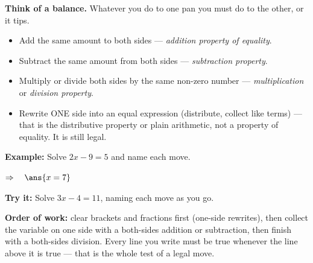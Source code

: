 \documentclass[12pt]{article}
\begin{document}


\begin{formulabox}
\textbf{Think of a balance.} Whatever you do to one pan you must do to the other, or it tips.
\begin{itemize}[leftmargin=0.75cm, itemsep=1pt, topsep=2pt]
  \item Add the same amount to both sides --- \emph{addition property of equality}.
  \item Subtract the same amount from both sides --- \emph{subtraction property}.
  \item Multiply or divide both sides by the same non-zero number --- \emph{multiplication} or
        \emph{division property}.
  \item Rewrite ONE side into an equal expression (distribute, collect like terms) --- that is the
        distributive property or plain arithmetic, not a property of equality. It is still legal.
\end{itemize}
\end{formulabox}

\begin{examplebox}
\textbf{Example:} \quad Solve $2x - 9 = 5$ and name each move.

$\Rightarrow\quad \ans{x = 7}$
\end{examplebox}

\begin{tryitbox}
\textbf{Try it:} \quad Solve $3x - 4 = 11$, naming each move as you go.\\[2pt]
\end{tryitbox}


\begin{formulabox}
\textbf{Order of work:} clear brackets and fractions first (one-side rewrites), then collect the
variable on one side with a both-sides addition or subtraction, then finish with a both-sides
division. Every line you write must be true whenever the line above it is true --- that is the whole
test of a legal move.
\end{formulabox}
\end{document}
